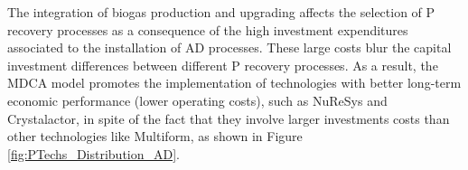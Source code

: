 \documentclass[authoryear]{elsarticle}
\begin{document}
The integration of biogas production and upgrading affects the selection of P recovery processes as a consequence of the high investment expenditures associated to the installation of AD processes. These large costs blur the capital investment differences between different P recovery processes. As a result, the MDCA model promotes the implementation of technologies with better long-term economic performance (lower operating costs), such as NuReSys and Crystalactor, in spite of the fact that they involve larger investments costs than other technologies like Multiform, as shown in Figure \ref{fig:PTechs_Distribution_AD}. 
\end{document}

